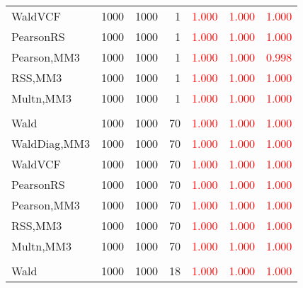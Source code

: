 \documentclass[
]{article}
\begin{document}
\begin{table}[H]
{\begin{tabular}[t]{lrrrrrr}
\hspace{1em}WaldVCF & 1000 & 1000 & 1 & \textcolor{red}{1.000} & \textcolor{red}{1.000} & \textcolor{red}{1.000}\\
\hspace{1em}PearsonRS & 1000 & 1000 & 1 & \textcolor{red}{1.000} & \textcolor{red}{1.000} & \textcolor{red}{1.000}\\
\hspace{1em}Pearson,MM3 & 1000 & 1000 & 1 & \textcolor{red}{1.000} & \textcolor{red}{1.000} & \textcolor{red}{0.998}\\
\hspace{1em}RSS,MM3 & 1000 & 1000 & 1 & \textcolor{red}{1.000} & \textcolor{red}{1.000} & \textcolor{red}{1.000}\\
\hspace{1em}Multn,MM3 & 1000 & 1000 & 1 & \textcolor{red}{1.000} & \textcolor{red}{1.000} & \textcolor{red}{1.000}\\
\addlinespace[0.3em]
\multicolumn{7}{l}{\textbf{1F 15V}}\\
\hspace{1em}Wald & 1000 & 1000 & 70 & \textcolor{red}{1.000} & \textcolor{red}{1.000} & \textcolor{red}{1.000}\\
\hspace{1em}WaldDiag,MM3 & 1000 & 1000 & 70 & \textcolor{red}{1.000} & \textcolor{red}{1.000} & \textcolor{red}{1.000}\\
\hspace{1em}WaldVCF & 1000 & 1000 & 70 & \textcolor{red}{1.000} & \textcolor{red}{1.000} & \textcolor{red}{1.000}\\
\hspace{1em}PearsonRS & 1000 & 1000 & 70 & \textcolor{red}{1.000} & \textcolor{red}{1.000} & \textcolor{red}{1.000}\\
\hspace{1em}Pearson,MM3 & 1000 & 1000 & 70 & \textcolor{red}{1.000} & \textcolor{red}{1.000} & \textcolor{red}{1.000}\\
\hspace{1em}RSS,MM3 & 1000 & 1000 & 70 & \textcolor{red}{1.000} & \textcolor{red}{1.000} & \textcolor{red}{1.000}\\
\hspace{1em}Multn,MM3 & 1000 & 1000 & 70 & \textcolor{red}{1.000} & \textcolor{red}{1.000} & \textcolor{red}{1.000}\\
\addlinespace[0.3em]
\multicolumn{7}{l}{\textbf{2F 10V}}\\
\hspace{1em}Wald & 1000 & 1000 & 18 & \textcolor{red}{1.000} & \textcolor{red}{1.000} & \textcolor{red}{1.000}\\

\end{tabular}}
\end{table}
\end{document}
